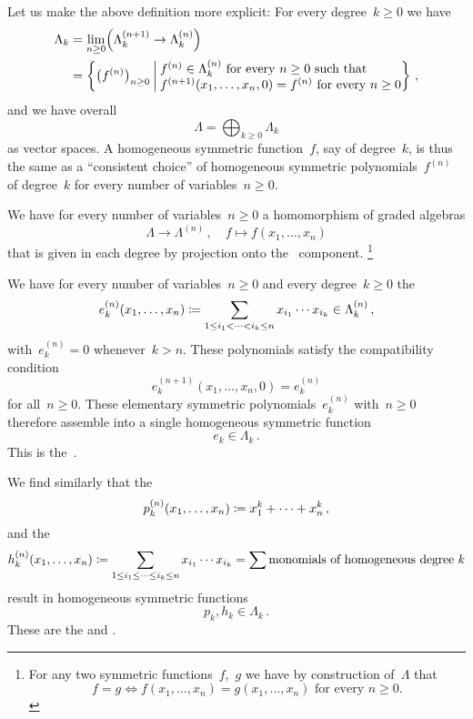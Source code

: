 \documentclass[a4paper,11pt]{scrartcl}
\begin{document}
Let us make the above definition more explicit:
For every degree~$k \geq 0$ we have
\begin{align*}
  \Lambda_k
  &=
  \lim_{n \geq 0}
  \Bigl( \Lambda^{(n+1)}_k \to \Lambda^{(n)}_k \Bigr)
  \\
  &=
  \left\{
    \bigl( f^{(n)} \bigr)_{n \geq 0}
    \suchthat*
    \begin{tabular}{@{}l@{}}
      $f^{(n)} \in \Lambda^{(n)}_k$ for every~$n \geq 0$ such that \\
      $f^{(n+1)}(x_1, \dotsc, x_n, 0) = f^{(n)}$ for every~$n \geq 0$
    \end{tabular}
  \right\} \,,
\end{align*}
and we have overall
\[
  \Lambda
  =
  \bigoplus_{k \geq 0} \Lambda_k
\]
as vector spaces.
A homogeneous symmetric function~$f$, say of degree~$k$, is thus the same as a \enquote{consistent choice} of homogeneous symmetric polynomials~$f^{(n)}$ of degree~$k$ for every number of variables~$n \geq 0$.

We have for every number of variables~$n \geq 0$ a homomorphism of graded algebras
\[
  \Lambda
  \to
  \Lambda^{(n)} \,,
  \quad
  f
  \mapsto
  f(x_1, \dotsc, x_n)
\]
that is given in each degree by projection onto the~ component.%
\footnote{%
  For any two symmetric functions~$f$,~$g$ we have by construction of~$\Lambda$ that
  \[
    f = g
    \iff
    \text{$f(x_1, \dotsc, x_n) = g(x_1, \dotsc, x_n)$ for every~$n \geq 0$.}
  \]
}

\begin{example}
  We have for every number of variables~$n \geq 0$ and every degree~$k \geq 0$ the 
  \[
    e^{(n)}_k(x_1, \dotsc, x_n)
    \coloneqq
    \sum_{1 \leq i_1 < \dotsb < i_k \leq n}
    x_{i_1} \dotsm x_{i_k}
    \in
    \Lambda^{(n)}_k \,,
  \]
  with~$e^{(n)}_k = 0$ whenever~$k > n$.
  These polynomials satisfy the compatibility condition
  \[
    e^{(n+1)}_k(x_1, \dotsc, x_n, 0)
    =
    e^{(n)}_k
  \]
  for all~$n \geq 0$.
  These elementary symmetric polynomials~$e^{(n)}_k$ with~$n \geq 0$ therefore assemble into a single homogeneous symmetric function
  \[
    e_k \in \Lambda_k \,.
  \]
  This is the~. 

  We find similarly that the 
  \[
    p^{(n)}_k(x_1, \dotsc, x_n)
    \coloneqq
    x_1^k + \dotsb + x_n^k \,,
  \]
  and the 
  \[
    h^{(n)}_k(x_1, \dotsc, x_n)
    \coloneqq
    \sum_{1 \leq i_1 \leq \dotsb \leq i_k \leq n}
    x_{i_1} \dotsm x_{i_k}
    =
    \sum \text{monomials of homogeneous degree~$k$}
  \]
  result in homogeneous symmetric functions
  \[
    p_k, h_k
    \in
    \Lambda_k \,.
  \]
  These are the  and .
\end{example}
\end{document}
